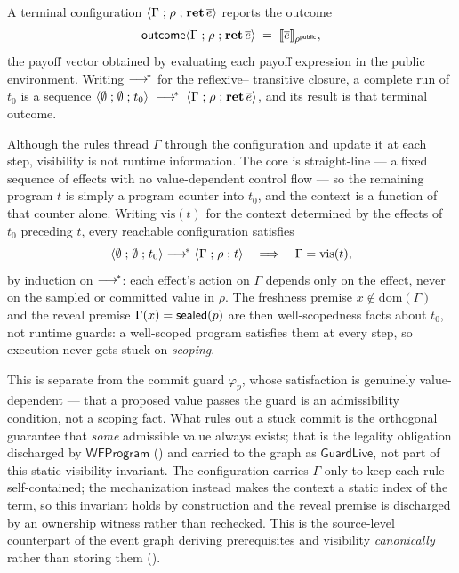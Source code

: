 A terminal configuration \(\langle \Gamma \mathrel{;} \rho \mathrel{;} \mathbf{ret}\,\overline{e} \rangle\)
reports the outcome
\[
  \mathsf{outcome}\langle \Gamma \mathrel{;} \rho \mathrel{;} \mathbf{ret}\,\overline{e} \rangle
    \;=\; \llbracket \overline{e} \rrbracket_{\rho^{\mathsf{public}}},
\]
the payoff vector obtained by evaluating each payoff expression in the
public environment.  Writing \(\longrightarrow^{\!*}\) for the reflexive--%
transitive closure, a complete run of \(t_0\) is a sequence
\(\langle \emptyset \mathrel{;} \emptyset \mathrel{;} t_0 \rangle \;\longrightarrow^{\!*}\;
  \langle \Gamma \mathrel{;} \rho \mathrel{;} \mathbf{ret}\,\overline{e} \rangle\),
and its result is that terminal outcome.

\begin{remark}
\label{rem:visibility-static}
Although the rules thread \(\Gamma\) through the configuration and update
it at each step, visibility is not runtime information.  The core is
straight-line --- a fixed sequence of effects with no value-dependent
control flow --- so the remaining program \(t\) is simply a program
counter into \(t_0\), and the context is a function of that counter
alone.  Writing \(\mathrm{vis}(t)\) for the context determined by the
effects of \(t_0\) preceding \(t\), every reachable configuration
satisfies
\[
  \langle \emptyset \mathrel{;} \emptyset \mathrel{;} t_0 \rangle \longrightarrow^{\!*}
  \langle \Gamma \mathrel{;} \rho \mathrel{;} t \rangle
  \quad\Longrightarrow\quad
  \Gamma = \mathrm{vis}(t),
\]
by induction on \(\longrightarrow^{\!*}\): each effect's action on \(\Gamma\)
depends only on the effect, never on the sampled or committed value in
\(\rho\).  The freshness premise \(x \notin \mathrm{dom}(\Gamma)\) and the
reveal premise \(\Gamma(x) = \mathsf{sealed}(p)\) are then well-scopedness facts
about \(t_0\), not runtime guards: a well-scoped program satisfies them at
every step, so execution never gets stuck on \emph{scoping}.

This is
separate from the commit guard \(\varphi_p\), whose satisfaction is
genuinely value-dependent --- that a proposed value passes the guard is an
admissibility condition, not a scoping fact.  What rules out a stuck commit
is the orthogonal guarantee that \emph{some} admissible value always exists;
that is the legality obligation discharged by \(\mathsf{WFProgram}\)
() and carried to the graph as \(\mathsf{GuardLive}\),
not part of this static-visibility invariant.  The configuration carries
\(\Gamma\) only to keep each rule self-contained; the mechanization
instead makes the context a static index of the term, so this invariant
holds by construction and the reveal premise is discharged by an
ownership witness rather than rechecked.  This is the source-level
counterpart of the event graph deriving prerequisites and visibility
\emph{canonically} rather than storing them ().
\end{remark}

